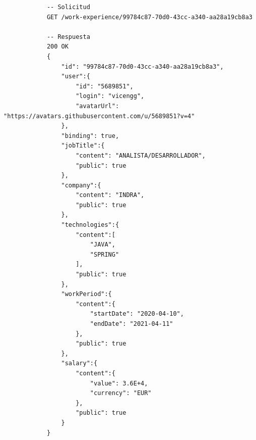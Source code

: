 \documentclass[a4paper, 12pt]{book}
\begin{document}
			{\footnotesize
			\begin{verbatim}
			-- Solicitud
			GET /work-experience/99784c87-70d0-43cc-a340-aa28a19cb8a3

			-- Respuesta
			200 OK
			{
			    "id": "99784c87-70d0-43cc-a340-aa28a19cb8a3",
			    "user":{
			        "id": "5689851",
			        "login": "vicengg",
			        "avatarUrl": "https://avatars.githubusercontent.com/u/5689851?v=4"
			    },
			    "binding": true,
			    "jobTitle":{
			        "content": "ANALISTA/DESARROLLADOR",
			        "public": true
			    },
			    "company":{
			        "content": "INDRA",
			        "public": true
			    },
			    "technologies":{
			        "content":[
			            "JAVA",
			            "SPRING"
			        ],
			        "public": true
			    },
			    "workPeriod":{
			        "content":{
			            "startDate": "2020-04-10",
			            "endDate": "2021-04-11"
			        },
			        "public": true
			    },
			    "salary":{
			        "content":{
			            "value": 3.6E+4,
			            "currency": "EUR"
			        },
			        "public": true
			    }
			}
			\end{verbatim}
			}
\end{document}
